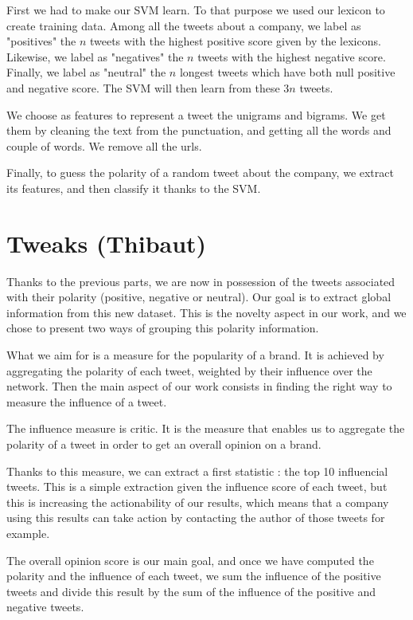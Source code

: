 \documentclass[a4paper,12pt]{report}
\begin{document}
First we had to make our SVM learn. To that purpose we used our lexicon to create training data. Among all the tweets about a company, we label as "positives" the $n$ tweets with the highest positive score given by the lexicons. Likewise, we label as "negatives" the $n$ tweets with the highest negative score. Finally, we label as "neutral" the $n$ longest tweets which have both null positive and negative score. The SVM will then learn from these $3n$ tweets.

We choose as features to represent a tweet the unigrams and bigrams. We get them by cleaning the text from the punctuation, and getting all the words and couple of words. We remove all the urls.

Finally, to guess the polarity of a random tweet about the company, we extract its features, and then classify it thanks to the SVM.

\section{Tweaks (Thibaut)}

Thanks to the previous parts, we are now in possession of the tweets associated with their polarity (positive, negative or neutral). Our goal is to extract global information from this new dataset.
This is the novelty aspect in our work, and we chose to present two ways of grouping this polarity information.

What we aim for is a measure for the popularity of a brand. It is achieved by aggregating the polarity of each tweet, weighted by their influence over the network.
Then the main aspect of our work consists in finding the right way to measure the influence of a tweet.

The influence measure is critic. It is the measure that enables us to aggregate the polarity of a tweet in order to get an overall opinion on a brand.

Thanks to this measure, we can extract a first statistic : the top 10 influencial tweets. This is a simple extraction given the influence score of each tweet, but this is increasing the actionability of our results, which means that a company using this results can take action by contacting the author of those tweets for example.

The overall opinion score is our main goal, and once we have computed the polarity and the influence of each tweet, we sum the influence of the positive tweets and divide this result by the sum of the influence of the positive and negative tweets.
\end{document}

